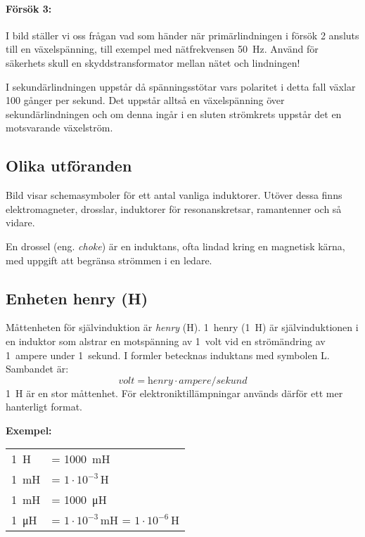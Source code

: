 \paragraph{Försök 3:}
I bild  ställer vi oss frågan vad som händer när
primärlindningen i försök 2 ansluts till en växelspänning, till exempel
med nätfrekvensen \qty{50}{\hertz}.
Använd för säkerhets skull en skyddstransformator mellan nätet och lindningen!

I sekundärlindningen uppstår då spänningsstötar vars polaritet i detta fall
växlar 100 gånger per sekund. Det uppstår alltså en växelspänning över
sekundärlindningen och om denna ingår i en sluten strömkrets uppstår det en
motsvarande växelström.


\subsection{Olika utföranden}

Bild  visar schemasymboler för ett antal vanliga induktorer.
Utöver dessa finns elektromagneter, drosslar, induktorer för resonanskretsar,
ramantenner och så vidare.

En drossel (eng. \emph{choke}) är en induktans, ofta lindad kring en 
magnetisk 
kärna, med uppgift att begränsa strömmen i en ledare.


\subsection{Enheten henry (H)}
\label{enheten_henry}

Måttenheten för självinduktion är \emph{henry} (\unit{\henry}).
1~henry (\qty{1}{\henry}) är självinduktionen i en induktor som alstrar en
motspänning av 1~volt vid en strömändring av 1~ampere under 1~sekund.
I formler betecknas induktans med symbolen L.
Sambandet är:
\[\textit{volt} = \textit{henry} \cdot \textit{ampere}/\textit{sekund}\]
\qty{1}{\henry} är en stor måttenhet.
För elektroniktillämpningar används därför ett mer hanterligt format.

\noindent\textbf{Exempel:}

\begin{center}
\begin{tabular}{ll}
\qty{1}{\henry} & = \qty{1000}{\milli\henry} \\
\qty{1}{\milli\henry} & = \(1 \cdot 10^{-3}\)\,H \\
\qty{1}{\milli\henry} & = \qty{1000}{\micro\henry} \\
\qty{1}{\micro\henry} & = \(1 \cdot 10^{-3}\)\,mH = \(1 \cdot 10^{-6}\)\,H
\end{tabular}
\end{center}

